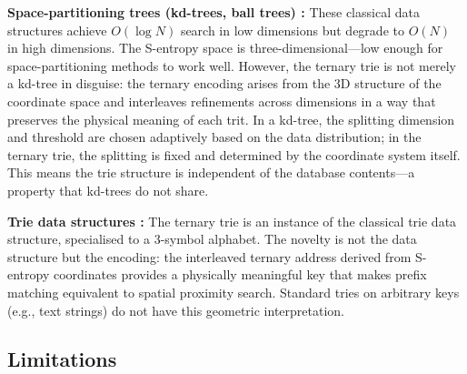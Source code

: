 \documentclass[11pt,twocolumn,a4paper]{article}
\theoremstyle{definition}
\theoremstyle{remark}
\begin{document}
\textbf{Space-partitioning trees (kd-trees, ball trees) \citep{knuth1998}:} These classical data structures achieve $O(\log N)$ search in low dimensions but degrade to $O(N)$ in high dimensions. The S-entropy space is three-dimensional---low enough for space-partitioning methods to work well. However, the ternary trie is not merely a kd-tree in disguise: the ternary encoding arises from the 3D structure of the coordinate space and interleaves refinements across dimensions in a way that preserves the physical meaning of each trit. In a kd-tree, the splitting dimension and threshold are chosen adaptively based on the data distribution; in the ternary trie, the splitting is fixed and determined by the coordinate system itself. This means the trie structure is independent of the database contents---a property that kd-trees do not share.

\textbf{Trie data structures \citep{fredkin1960}:} The ternary trie is an instance of the classical trie data structure, specialised to a 3-symbol alphabet. The novelty is not the data structure but the encoding: the interleaved ternary address derived from S-entropy coordinates provides a physically meaningful key that makes prefix matching equivalent to spatial proximity search. Standard tries on arbitrary keys (e.g., text strings) do not have this geometric interpretation.

\subsection{Limitations}
\end{document}
